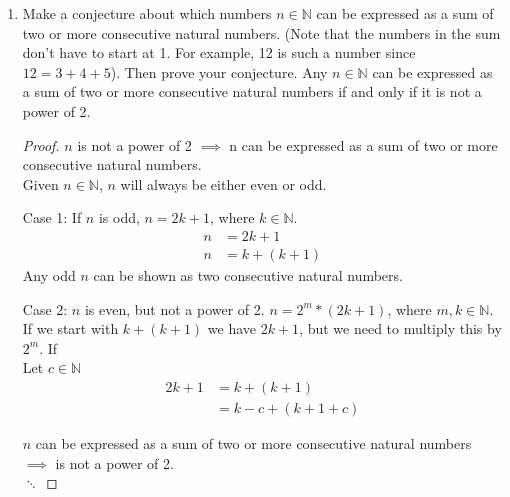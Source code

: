 \documentclass[12pt,a4paper,reqno,parskip=full]{amsart}
\numberwithin{equation}{section}
\theoremstyle{plain}
\theoremstyle{definition}
\begin{document}
\begin{enumerate}
\begin{proof}
          Assume $A$, $B$, $C$, and $D$ are all non-empty have no duplicate elements between them.
          \[|(A\times B)\cup(C\times D)| = |A| * |B| + |C| * |D|\]
          \begin{align*}
            |(A\cup C)\times(B\cup D)| & = (|A| + |C|) * (|B| + |D|)                     \\
                                       & = |A| * |B| + |C| * |D| + |A| * |D| + |B| * |C| \\
          \end{align*}
          \begin{align*}
            |A| * |B| + |C| * |D| & = |A| * |B| + |C| * |D| + |A| * |D| + |B| * |C| \\
            0                     & = |A| * |D| + |B| * |C|
          \end{align*}
          Clearly, the conjecture does not hold in this case.
        \end{proof}
  \item Make a conjecture about which numbers $n\in\mathbb{N}$ can be expressed as a sum of two or
        more consecutive natural numbers. (Note that the numbers in the sum don't have to start at
        1. For example, 12 is such a number since $12=3+4+5$). Then prove your conjecture.
        \conjecture Any $n\in\mathbb{N}$ can be expressed as a sum of two or more consecutive
        natural numbers if and only if it is not a power of 2.
        \begin{proof}
          $n$ is not a power of 2 $\implies$
          n can be expressed as a sum of two or more consecutive natural numbers. \\
          Given $n\in\mathbb{N}$, $n$ will always be either even or odd.

          Case 1: If $n$ is odd, $n=2k+1$, where $k\in\mathbb{N}$.
          \begin{align*}
            n & = 2k + 1      \\
            n & = k + (k + 1)
          \end{align*}
          Any odd $n$ can be shown as two consecutive natural numbers.

          Case 2: $n$ is even, but not a power of 2. $n = 2^m * (2k + 1)$, where $m,k\in\mathbb{N}$.
          If we start with $k + (k + 1)$ we have $2k + 1$, but we need to multiply this by $2^m$. If
          \\ Let $c\in\mathbb{N}$
          \begin{align*}
            2k + 1 & = k + (k + 1)         \\
                   & = k - c + (k + 1 + c)
          \end{align*}
          

          $n$ can be expressed as a sum of two or more consecutive natural numbers
          $\implies$ is not a power of 2. \\
          $\ddots$
        \end{proof}
\end{enumerate}
\end{document}
